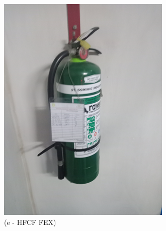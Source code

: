 \begin{figure}[h]
\begin{minipage}[b]{0.22\linewidth}
	\includegraphics[width=\textwidth]{figures/ch04_fig_safety07}
	\caption*{(e - HFCF FEX)}
\end{minipage}
	\hspace{0.03cm}
\begin{minipage}[b]{0.22\linewidth}
	\centering

\end{minipage}
\end{figure}
